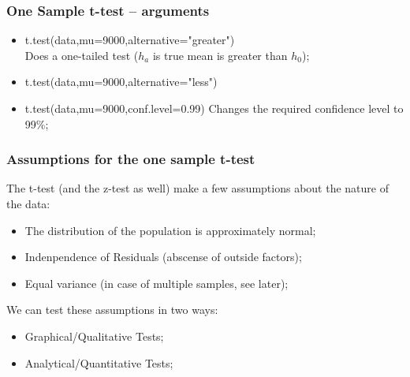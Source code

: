 \documentclass[10pt]{beamer}
\begin{document}
\begin{frame}
  \frametitle{One Sample t-test -- arguments}
  \begin{itemize}
  \item t.test(data,mu=9000,alternative="greater")\\
    Does a one-tailed test ($h_a$ is true mean is greater than $h_0$);
  \item t.test(data,mu=9000,alternative="less")
  \item t.test(data,mu=9000,conf.level=0.99)
    Changes the required confidence level to 99\%;
  \end{itemize}
\end{frame}

\begin{frame}
  \frametitle{Assumptions for the one sample t-test}
  
  The t-test (and the z-test as well) make a few assumptions about the
  nature of the data:

  \bigskip

  \begin{itemize}
  \item The distribution of the population is approximately normal;
  \item Indenpendence of Residuals (abscense of outside factors);
  \item Equal variance (in case of multiple samples, see later);
  \end{itemize}

  \bigskip

  We can test these assumptions in two ways:
  \begin{itemize}
  \item Graphical/Qualitative Tests;
  \item Analytical/Quantitative Tests;
  \end{itemize}
\end{frame}
\end{document}
